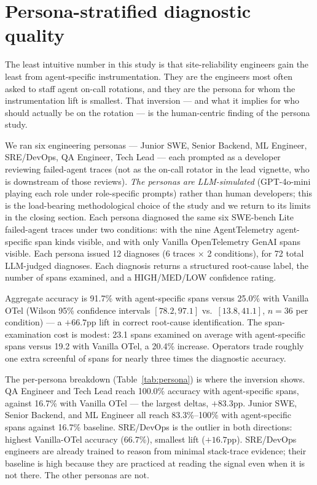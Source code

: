 \documentclass[journal]{IEEEtran}
\begin{document}
\section{Persona-stratified diagnostic quality}

The least intuitive number in this study is that site-reliability engineers gain the least from agent-specific instrumentation. They are the engineers most often asked to staff agent on-call rotations, and they are the persona for whom the instrumentation lift is smallest. That inversion --- and what it implies for who should actually be on the rotation --- is the human-centric finding of the persona study.

We ran six engineering personas --- Junior SWE, Senior Backend, ML Engineer, SRE/DevOps, QA Engineer, Tech Lead --- each prompted as a developer reviewing failed-agent traces (not as the on-call rotator in the lead vignette, who is downstream of those reviews). \emph{The personas are LLM-simulated} (GPT-4o-mini playing each role under role-specific prompts) rather than human developers; this is the load-bearing methodological choice of the study and we return to its limits in the closing section. Each persona diagnosed the same six SWE-bench Lite~\cite{swebench} failed-agent traces under two conditions: with the nine AgentTelemetry agent-specific span kinds visible, and with only Vanilla OpenTelemetry GenAI spans visible. Each persona issued 12 diagnoses (6 traces $\times$ 2 conditions), for 72 total LLM-judged diagnoses. Each diagnosis returns a structured root-cause label, the number of spans examined, and a HIGH/MED/LOW confidence rating.

Aggregate accuracy is 91.7\% with agent-specific spans versus 25.0\% with Vanilla OTel (Wilson 95\% confidence intervals $[78.2, 97.1]$ vs.\ $[13.8, 41.1]$, $n{=}36$ per condition) --- a $+66.7$pp lift in correct root-cause identification. The span-examination cost is modest: 23.1 spans examined on average with agent-specific spans versus 19.2 with Vanilla OTel, a 20.4\% increase. Operators trade roughly one extra screenful of spans for nearly three times the diagnostic accuracy.

The per-persona breakdown (Table~\ref{tab:persona}) is where the inversion shows. QA Engineer and Tech Lead reach 100.0\% accuracy with agent-specific spans, against 16.7\% with Vanilla OTel --- the largest deltas, $+83.3$pp. Junior SWE, Senior Backend, and ML Engineer all reach 83.3\%--100\% with agent-specific spans against 16.7\% baseline. SRE/DevOps is the outlier in both directions: highest Vanilla-OTel accuracy (66.7\%), smallest lift ($+16.7$pp). SRE/DevOps engineers are already trained to reason from minimal stack-trace evidence; their baseline is high because they are practiced at reading the signal even when it is not there. The other personas are not.
\end{document}
